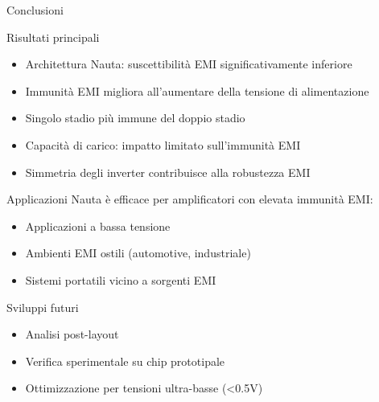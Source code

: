 \documentclass[aspectratio=169, 9pt]{beamer}
\begin{document}
\begin{frame}{Conclusioni}
    \begin{block}{Risultati principali}
        \begin{itemize}\small
            \item Architettura Nauta: suscettibilità EMI significativamente inferiore
            \item Immunità EMI migliora all'aumentare della tensione di alimentazione
            \item Singolo stadio più immune del doppio stadio
            \item Capacità di carico: impatto limitato sull'immunità EMI
            \item Simmetria degli inverter contribuisce alla robustezza EMI
        \end{itemize}
    \end{block}
    
    \vspace{0.2cm}
    \begin{alertblock}{Applicazioni}
        Nauta è efficace per amplificatori con elevata immunità EMI:
        \begin{itemize}\small
            \item Applicazioni a bassa tensione
            \item Ambienti EMI ostili (automotive, industriale)
            \item Sistemi portatili vicino a sorgenti EMI
        \end{itemize}
    \end{alertblock}
    
    \vspace{0.2cm}
    \begin{block}{Sviluppi futuri}
        \begin{itemize}\small
            \item Analisi post-layout
            \item Verifica sperimentale su chip prototipale
            \item Ottimizzazione per tensioni ultra-basse (<0.5V)
        \end{itemize}
    \end{block}
\end{frame}
\end{document}
